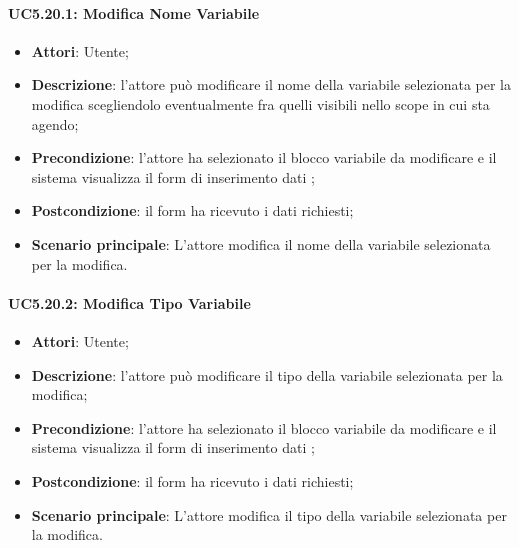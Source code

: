 \paragraph{UC5.20.1: Modifica Nome Variabile}
\label{UC5.20.1}
\begin{itemize}
	\item \textbf{Attori}: Utente;
	\item \textbf{Descrizione}: l'attore può modificare il nome della variabile selezionata per la modifica scegliendolo eventualmente fra quelli visibili nello scope in cui sta agendo;
	\item \textbf{Precondizione}: l'attore ha selezionato il blocco variabile da modificare e il sistema visualizza il form di inserimento dati ;
	\item \textbf{Postcondizione}: il form ha ricevuto i dati richiesti;
	\item \textbf{Scenario principale}: L'attore modifica il nome della variabile selezionata per la modifica.
\end{itemize}

\paragraph{UC5.20.2: Modifica Tipo Variabile}
\label{UC5.20.2}
\begin{itemize}
	\item \textbf{Attori}: Utente;
	\item \textbf{Descrizione}: l'attore può modificare il tipo della variabile selezionata per la modifica;
	\item \textbf{Precondizione}: l'attore ha selezionato il blocco variabile da modificare e il sistema visualizza il form di inserimento dati ;
	\item \textbf{Postcondizione}: il form ha ricevuto i dati richiesti;
	\item \textbf{Scenario principale}: L'attore modifica il tipo della variabile selezionata per la modifica.
	\end{itemize}
